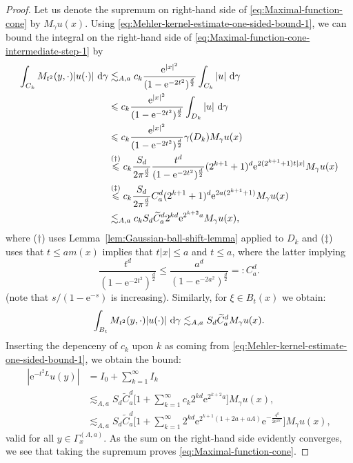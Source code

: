 \documentclass{amsart}
\theoremstyle{remark}
\newcommand{\D}{\,\textup{d}}
\renewcommand{\leq}{\leqslant}
\newcommand{\e}{\mathrm{e}} %
\begin{document}
\begin{proof}
  Let us denote the supremum on right-hand side of
  \eqref{eq:Maximal-function-cone} by $M_\gamma u (x)$. Using
  \eqref{eq:Mehler-kernel-estimate-one-sided-bound-1}, we can bound the
  integral on the right-hand side of
  \eqref{eq:Maximal-function-cone-intermediate-step-1} by
  \begin{align*}
    \int_{C_k}  M_{t^2}(y, \cdot) |u(\cdot)| \,\D\gamma & \lesssim_{A, a}
    c_k \frac{\e^{|x|^2}}{(1 - \e^{-2t^2})^{\frac{d}2}}   \int_{C_k}
    |u| \,\D\gamma\\ 
    &\leq c_k \frac {\e^{|x|^2}} {(1 -
      \e^{-2t^2})^{\frac{d}2}} \int_{D_k} |u| \,\D\gamma\\ 
    &\leq c_k  \frac{\e^{|x|^2}}{(1 - \e^{-2t^2})^{\frac{d}2}} \gamma(D_k) M_\gamma u(x)\\
    &\overset{(\dagger)}{\leq} c_k \frac{S_d}{2 \pi^{\frac{d}{2}}} \frac{t^d}{(1 - \e^{-2t^2})^{\frac{d}2}} (2^{k + 1} + 1)^d \e^{2(2^{k + 1} + 1)t|x|} M_\gamma u(x)\\
    &\overset{(\ddagger)}{\leq} c_k \frac{S_d}{2 \pi^{\frac{d}{2}}} C_a^d (2^{k
      + 1} + 1)^d \e^{2a(2^{k + 1} + 1)} M_\gamma u(x)\\
    &\lesssim_{A, a} c_k S_d\widetilde{C}_a^d 2^{k d} \e^{2^{k + 2}a} M_\gamma u(x),
  \end{align*}
  where ($\dagger$) uses Lemma~\ref{lem:Gaussian-ball-shift-lemma} applied to
  $D_k$ and ($\ddagger$) uses that $t \leq a m(x)$ implies that $t |x| \leq a$ and
  $t\leq a$, where the latter implying 
 \begin{equation*}
    \frac{t^d}{(1 - \e^{-2t^2})^{\frac{d}2}} \leq
     \frac{a^d}{(1 - \e^{-2a^2})^{\frac{d}2}} =: C_a^d.
  \end{equation*}
  (note that $s/(1-\e^{-s})$ is increasing). Similarly, for $\xi \in B_t(x)$ we
 obtain:
   \begin{equation*}
    \int_{B_t}  M_{t^2}(y, \cdot) |u(\cdot)| \,\D\gamma \lesssim_{A, a} S_d \widetilde{C}_a^d M_\gamma u(x).
  \end{equation*}
  Inserting the depenceny of $c_k$ upon $k$ as coming from
  \eqref{eq:Mehler-kernel-estimate-one-sided-bound-1}, we obtain the bound:
  \begin{align*}
    |\e^{-t^2 L} u(y)| &= I_0 + \sum_{k = 1}^\infty I_k\\
    &\lesssim_{A, a} S_d \widetilde{C}_a^d \biggl[1 + \sum_{k =  1}^\infty c_k
      2^{k d} \e^{2^{k + 2}a} \biggr] M_\gamma u(x),\\
    &\lesssim_{A, a} S_d \widetilde{C}_a^d \biggl[1 + \sum_{k = 1}^\infty 2^{k
        d} \e^{2^{k + 1} (1 + 2a + aA)} \e^{-\frac{4^k}{2 \e^{2 a^2}}} \biggr]
    M_\gamma u(x),
  \end{align*}
  valid for all $y \in \Gamma_x^{(A, a)}$. As the sum on the right-hand side
  evidently converges, we see that taking the supremum proves
  \eqref{eq:Maximal-function-cone}.
\end{proof}



\end{document}
